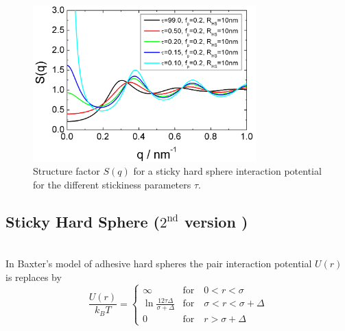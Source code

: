 \begin{figure}[htb]
\begin{center}
\includegraphics[width=0.768\textwidth,height=0.528\textwidth]{../images/structure_factor/HardSphere/StickyHardSphere1.png}
\end{center}
\caption{Structure factor $S(q)$ for a sticky hard sphere interaction potential for the different
stickiness parameters $\tau$.}
\label{fig:SQStickyHardSphere1}
\end{figure}

\clearpage
\subsection{Sticky Hard Sphere ($2^\text{nd}$ version \cite{Regnaut1989,Regnaut1990})} ~\\

In Baxter's model of adhesive hard spheres the pair interaction
potential $U(r)$ is replaces by
\begin{equation}
\frac{U(r)}{k_BT} =
 \begin{cases}
      \infty    & \text{for} \quad 0<r<\sigma \\
      \ln\frac{12\tau\Delta}{\sigma+\Delta} & \text{for} \quad \sigma<r<\sigma+\Delta \\
      0         & \text{for} \quad r>\sigma+\Delta
   \end{cases}
\end{equation}




